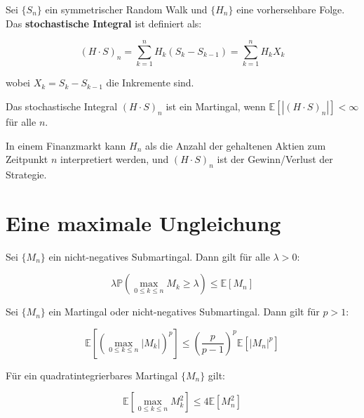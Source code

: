 Sei $\{S_n\}$ ein symmetrischer Random Walk und $\{H_n\}$ eine vorhersehbare Folge. Das \textbf{stochastische Integral} ist definiert als:

\begin{equation}
(H \cdot S)_n = \sum_{k=1}^n H_k (S_k - S_{k-1}) = \sum_{k=1}^n H_k X_k
\end{equation}

wobei $X_k = S_k - S_{k-1}$ die Inkremente sind.

\begin{theorem}
Das stochastische Integral $(H \cdot S)_n$ ist ein Martingal, wenn $\mathbb{E}[|(H \cdot S)_n|] < \infty$ für alle $n$.
\end{theorem}

\begin{example}
In einem Finanzmarkt kann $H_n$ als die Anzahl der gehaltenen Aktien zum Zeitpunkt $n$ interpretiert werden, und $(H \cdot S)_n$ ist der Gewinn/Verlust der Strategie.
\end{example}

\section{Eine maximale Ungleichung}

\begin{theorem}
Sei $\{M_n\}$ ein nicht-negatives Submartingal. Dann gilt für alle $\lambda > 0$:

\begin{equation}
\lambda \mathbb{P}\left(\max_{0 \leq k \leq n} M_k \geq \lambda\right) \leq \mathbb{E}[M_n]
\end{equation}
\end{theorem}

\begin{theorem}
Sei $\{M_n\}$ ein Martingal oder nicht-negatives Submartingal. Dann gilt für $p > 1$:

\begin{equation}
\mathbb{E}\left[\left(\max_{0 \leq k \leq n} |M_k|\right)^p\right] \leq \left(\frac{p}{p-1}\right)^p \mathbb{E}[|M_n|^p]
\end{equation}
\end{theorem}

\begin{corollary}
Für ein quadratintegrierbares Martingal $\{M_n\}$ gilt:

\begin{equation}
\mathbb{E}\left[\max_{0 \leq k \leq n} M_k^2\right] \leq 4 \mathbb{E}[M_n^2]
\end{equation}
\end{corollary}

